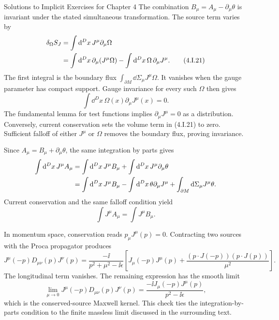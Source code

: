 \begin{bankssolutions}{Solutions to Implicit Exercises for Chapter 4}
The combination $B_\mu=A_\mu-\partial_\mu\theta$ is invariant under the
stated simultaneous transformation.  The source term varies by
\begin{align*}
 \delta_\Omega S_J
 &=\int\mathop{}\!\mathrm{d}^D x\,J^\mu\partial_\mu\Omega\notag\\
 &=\int\mathop{}\!\mathrm{d}^D x\,\partial_\mu(J^\mu\Omega)
   -\int\mathop{}\!\mathrm{d}^D x\,\Omega\,\partial_\mu J^\mu.
 \tag{4.I.21}
\end{align*}
The first integral is the boundary flux
$\int_{\partial M}\dd\Sigma_\mu J^\mu\Omega$.  It vanishes when the gauge
parameter has compact support.  Gauge invariance for every such $\Omega$
then gives
\begin{equation*}
 \int\dd^D x\,\Omega(x)\partial_\mu J^\mu(x)=0.
\end{equation*}
The fundamental lemma for test functions implies
$\partial_\mu J^\mu=0$ as a distribution.  Conversely, current conservation
sets the volume term in (4.I.21) to zero.  Sufficient falloff of either
$J^\mu$ or $\Omega$ removes the boundary flux, proving invariance.

Since $A_\mu=B_\mu+\partial_\mu\theta$, the same integration by parts gives
\begin{align*}
 \int\mathop{}\!\mathrm{d}^D x\,J^\mu A_\mu
 &=\int\mathop{}\!\mathrm{d}^D x\,J^\mu B_\mu
   +\int\mathop{}\!\mathrm{d}^D x\,J^\mu\partial_\mu\theta\notag\\
 &=\int\mathop{}\!\mathrm{d}^D x\,J^\mu B_\mu
   -\int\mathop{}\!\mathrm{d}^D x\,\theta\partial_\mu J^\mu
   +\int_{\partial M}\mathop{}\!\mathrm{d}\Sigma_\mu J^\mu\theta.
\end{align*}
Current conservation and the same falloff condition yield
\begin{equation*}
 \int J^\mu A_\mu=\int J^\mu B_\mu.
 \tag{4.I.22}
\end{equation*}

In momentum space, conservation reads $p_\mu J^\mu(p)=0$.  Contracting two
sources with the Proca propagator produces
\begin{equation*}
 J^\mu(-p)D_{\mu\nu}(p)J^\nu(p)
 =\frac{-\ii}{p^2+\mu^2-\ii\epsilon}
 \left[J_\mu(-p)J^\mu(p)
 +\frac{(p\cdot J(-p))(p\cdot J(p))}{\mu^2}\right].
\end{equation*}
The longitudinal term vanishes.  The remaining expression has the smooth
limit
\begin{equation*}
 \lim_{\mu\to0}J^\mu(-p)D_{\mu\nu}(p)J^\nu(p)
 =\frac{-\ii J_\mu(-p)J^\mu(p)}{p^2-\ii\epsilon},
\end{equation*}
which is the conserved-source Maxwell kernel.  This check ties the
integration-by-parts condition to the finite massless limit discussed in the
surrounding text.

\end{bankssolutions}
